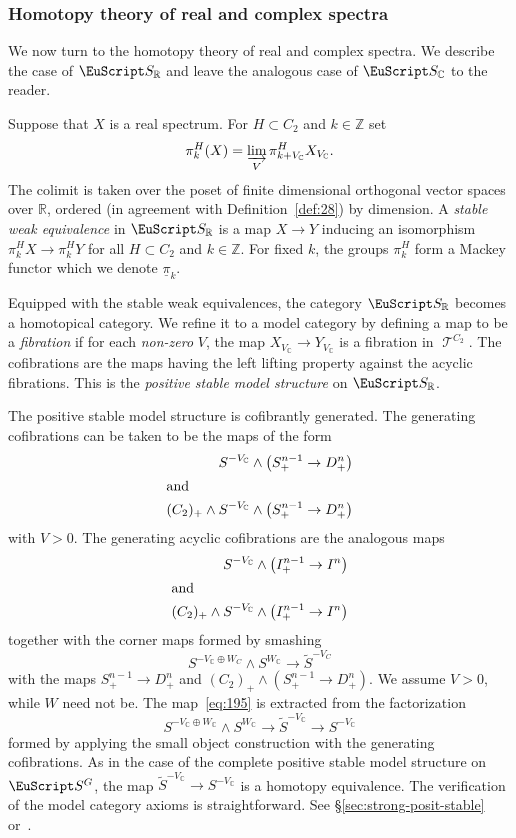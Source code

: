\documentclass{amsart}
\theoremstyle{definition}
\theoremstyle{remark}
\newcommand{\Z}{{\mathbb Z}}
\newcommand{\R}{{\mathbb R}}
\newcommand{\C}{\mathbb C}
\newcommand{\spectra}{\EuScript S}
\DeclareMathOperator{\spaces}{\mathcal T}
\newcommand{\pim}{\underline{\pi}}
\newcommand{\ugspaces}[1]{\spaces^{#1}}
\newcommand{\ugspectra}[1]{\spectra^{#1}}
\newcommand{\zt}{C_{2}}
\newcommand{\rspectra}{\spectra_{\R}}
\newcommand{\cspectra}{\spectra_{\C}}
\begin{document}
\subsubsection{Homotopy theory of real and complex spectra}
\label{sec:homotopy-theory-real}

We now turn to the homotopy theory of real and complex spectra.  We
describe the case of $\rspectra$ and leave the analogous case of
$\cspectra$ to the reader.

Suppose that $X$ is a real spectrum.  For $H\subset \zt$ and $k\in\Z$
set 
\[
\pi_{k}^{H}(X) = \varinjlim_{V}\pi_{k+V_{\C}}^{H}X_{V_{\C}}.
\]
The colimit is taken over the poset of finite dimensional orthogonal
vector spaces over $\R$, ordered (in agreement with
Definition~\ref{def:28}) by dimension.  A {\em stable weak
equivalence} in $\rspectra$ is a map $X\to Y$ inducing an isomorphism
$\pi^{H}_{k}X\to \pi^{H}_{k}Y$ for all $H\subset \zt$ and $k\in\Z$.
For fixed $k$, the groups $\pi^{H}_{k}$ form a Mackey functor which we
denote $\pim_{k}$.

Equipped with the stable weak equivalences, the category $\rspectra$
becomes a homotopical category.  We refine it to a model category by
defining a map to be a {\em fibration} if for each {\em non-zero} $V$,
the map $X_{V_{\C}}\to Y_{V_{\C}}$ is a fibration in $\ugspaces{\zt}$.
The cofibrations are the maps having the left lifting property against
the acyclic fibrations.  This is the {\em positive stable model
structure} on $\rspectra$.

The positive stable model structure is cofibrantly generated.  The
generating cofibrations can be taken to be the maps of the form
\begin{align*}
S^{-V_{\C}}\wedge \big(S^{n-1}_{+} &\to D^{n}_{+}\big) \\
\intertext{and}
(\zt)_{+} \wedge S^{-V_{\C}}\wedge \big(S^{n-1}_{+}&\to
D^{n}_{+}\big)
\end{align*}
with $V>0$.    The generating acyclic
cofibrations are the analogous maps
\begin{align*}
S^{-V_{\C}}\wedge \big(I^{n-1}_{+}&\to I^{n}\big) \\
\intertext{and}
(\zt)_{+}\wedge S^{-V_{\C}}\wedge \big(I^{n-1}_{+}&\to I^{n}  \big)
\end{align*}
together with the corner maps formed by smashing 
\begin{equation}
\label{eq:195}
S^{-V_{\C}\oplus W_{C}}\wedge S^{W_{\C}}\to \tilde S^{-V_{C}} 
\end{equation}
with the maps $S^{n-1}_{+}\to D^{n}_{+}$ and $(\zt)_{+}\wedge
(S^{n-1}_{+}\to D^{n}_{+})$.  We assume $V>0$, while $W$ need not be.
The map~\eqref{eq:195} is extracted from the factorization
\[
S^{-V_{\C}\oplus W_{\C}}\wedge S^{W_{\C}}\to \tilde S^{-V_{\C}} \to S^{-V_{\C}}
\]
formed by applying the small object construction with the generating
cofibrations.  As in the case of the complete positive stable model
structure on $\ugspectra{G}$, the map $\tilde S^{-V_{\C}}\to
S^{-V_{\C}}$ is a homotopy equivalence.  The verification of the model
category axioms is straightforward.  See
\S\ref{sec:strong-posit-stable} or~\cite{MR1806878}.  
\end{document}
